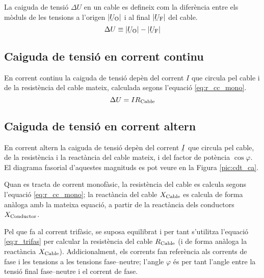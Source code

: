 La caiguda de tensió $\Delta U$ en un cable es defineix com la diferència entre els mòduls de les tensions a l'origen $|{\cmplx{U}\ped{O}}|$ i al final $|\cmplx{U}\ped{F}|$ del cable.
\begin{equation}
   \Delta U \equiv |\cmplx{U}\ped{O}| - |\cmplx{U}\ped{F}|
\end{equation}

\subsection{Caiguda de tensió en corrent continu}

En corrent continu la caiguda de tensió depèn del corrent $I$ que circula pel cable i de la  resistència del  cable mateix, calculada segons l'equació \eqref{eq:r_cc_mono}.
\begin{equation}
   \Delta U = I R_\mathrm{Cable}
\end{equation}

\subsection{Caiguda de tensió en corrent altern}

En corrent altern la caiguda de tensió
depèn del  corrent $\cmplx{I}$ que circula pel cable, de la
resistència i la reactància del  cable mateix, i del factor de
potència $\cos \varphi$. El diagrama fasorial d'aquestes magnituds
es pot veure en la Figura \vref{pic:cdt_ca}.

\begin{center}
   
   \label{pic:cdt_ca}
\end{center}

Quan es tracta de corrent monofàsic, la resistència del cable es calcula segons l'equació
\eqref{eq:r_cc_mono}; la reactància del cable $X_\mathrm{Cable}$ es calcula de forma anàloga
amb la mateixa equació, a partir de la reactància dels conductors $X_\mathrm{Conductor}$.

Pel que fa al corrent trifàsic, se suposa equilibrat i per tant s'utilitza l'equació
\eqref{eq:r_trifas} per calcular la resistència del cable $R_\mathrm{Cable}$ (i de forma
anàloga la reactància $X_\mathrm{Cable}$). Addicionalment, els corrents fan referència als
corrents de fase i les tensions a les tensions fase--neutre; l'angle $\varphi$ és per
tant l'angle entre la tensió final fase--neutre i el corrent de fase.

